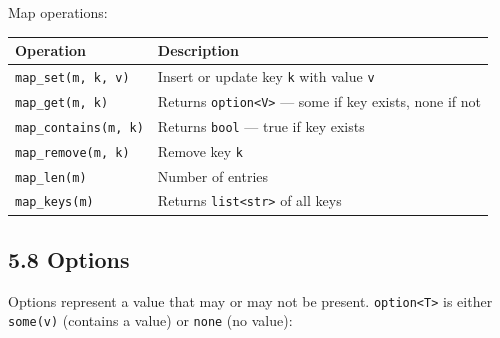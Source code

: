 \documentclass[
  english,
]{book}
\begin{document}
Map operations:

\begin{longtable}[]{@{}
  >{\raggedright\arraybackslash}p{}
  >{\raggedright\arraybackslash}p{}@{}}
\toprule\noalign{}
\begin{minipage}[b]{\linewidth}\raggedright
Operation
\end{minipage} & \begin{minipage}[b]{\linewidth}\raggedright
Description
\end{minipage} \\
\midrule\noalign{}
\endhead
\bottomrule\noalign{}
\endlastfoot
\texttt{map\_set(m,\ k,\ v)} & Insert or update key \texttt{k} with
value \texttt{v} \\
\texttt{map\_get(m,\ k)} & Returns
\texttt{option\textless{}V\textgreater{}} --- some if key exists, none
if not \\
\texttt{map\_contains(m,\ k)} & Returns \texttt{bool} --- true if key
exists \\
\texttt{map\_remove(m,\ k)} & Remove key \texttt{k} \\
\texttt{map\_len(m)} & Number of entries \\
\texttt{map\_keys(m)} & Returns
\texttt{list\textless{}str\textgreater{}} of all keys \\
\end{longtable}

\subsection{5.8 Options}\label{options}

Options represent a value that may or may not be present.
\texttt{option\textless{}T\textgreater{}} is either \texttt{some(v)}
(contains a value) or \texttt{none} (no value):
\end{document}
